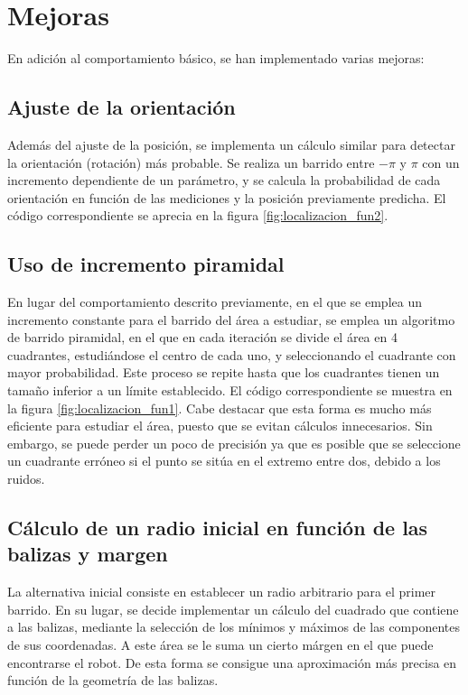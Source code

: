 
\section{Mejoras}
En adición al comportamiento básico, se han implementado varias mejoras:
\subsection{Ajuste de la orientación} Además del ajuste de la posición, se implementa un cálculo similar para detectar la orientación (rotación) más probable. Se realiza un barrido entre $-\pi$ y $\pi$ con un incremento dependiente de un parámetro, y se calcula la probabilidad de cada orientación en función de las mediciones y la posición previamente predicha. El código correspondiente se aprecia en la figura \ref{fig:localizacion_fun2}.
\subsection{Uso de incremento piramidal} En lugar del comportamiento descrito previamente, en el que se emplea un incremento constante para el barrido del área a estudiar, se emplea un algoritmo de barrido piramidal, en el que en cada iteración se divide el área en 4 cuadrantes,
estudiándose el centro de cada uno, y seleccionando el cuadrante con mayor probabilidad. Este proceso se repite hasta que los cuadrantes tienen un tamaño inferior a un límite establecido. El código correspondiente se muestra en la figura \ref{fig:localizacion_fun1}. Cabe destacar
que esta forma es mucho más eficiente para estudiar el área, puesto que se evitan cálculos innecesarios. Sin embargo, se puede perder un poco de precisión ya que es posible que se seleccione un cuadrante erróneo si el punto se sitúa en el extremo entre dos, debido a los ruidos.
\subsection{Cálculo de un radio inicial en función de las balizas y margen} La alternativa inicial consiste en establecer un radio arbitrario para el primer barrido. En su lugar,
se decide implementar un cálculo del cuadrado que contiene a las balizas, mediante la selección de los mínimos y máximos de las componentes de sus coordenadas. A este área se le suma un cierto márgen
en el que puede encontrarse el robot. De esta forma se consigue una aproximación más precisa en función de la geometría de las balizas.
